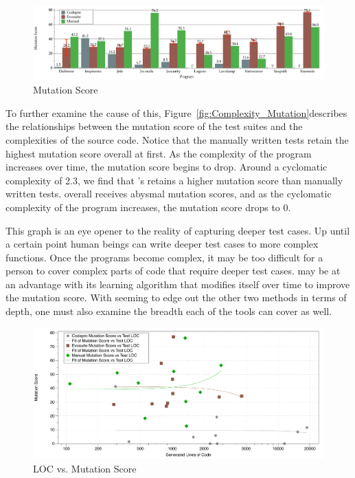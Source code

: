 \begin{figure}[!t]
\centering
  \includegraphics[width=\textwidth]{Mutation_Score}
    \caption{Mutation Score}
  \label{fig:Mutation_Score}
\end{figure}

To further examine the cause of this, Figure~\ref{fig:Complexity_Mutation}describes the relationships between the mutation score of the test suites and the complexities of the source code. Notice that the manually written tests retain the highest mutation score overall at first. As the complexity of the program increases over time, the mutation score begins to drop. Around a cyclomatic complexity of 2.3, we find that \evo's retains a higher mutation score than manually written tests. \codepro overall receives abysmal mutation scores, and as the cyclomatic complexity of the program increases, the mutation score drops to 0.

This graph is an eye opener to the reality of capturing deeper test cases. Up until a certain point human beings can write deeper test cases to more complex functions. Once the programs become complex, it may be too difficult for a person to cover complex parts of code that require deeper test cases. \evo may be at an advantage with its learning algorithm that modifies itself over time to improve the mutation score. With \evo seeming to edge out the other two methods in terms of depth, one must also examine the breadth each of the tools can cover as well.

\begin{figure}[!t]
\centering
  \includegraphics[width=\textwidth]{LOC_Mutation}
    \caption{LOC vs. Mutation Score}
  \label{fig:LOC_Mutation}
\end{figure}


